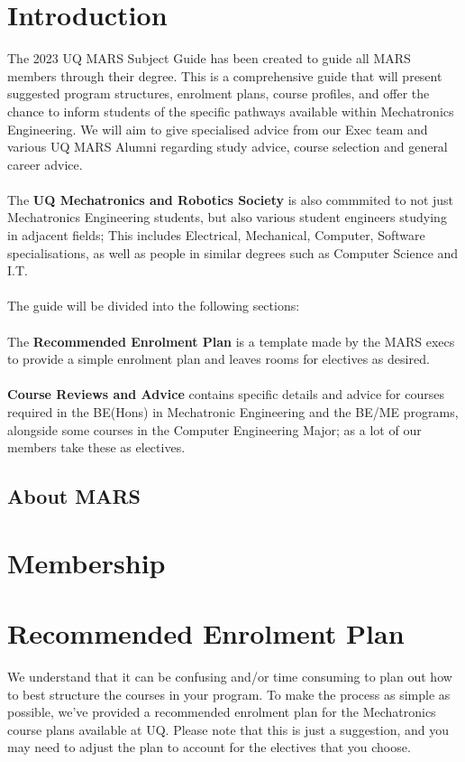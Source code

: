 \documentclass[a4paper,12pt]{report}
\begin{document}
\chapter{Introduction}
    The 2023 UQ MARS Subject Guide has been created to guide all MARS members through their degree. This is a comprehensive guide that will present suggested program structures, enrolment plans, course profiles, and offer the chance to inform students of the specific pathways available within Mechatronics Engineering. We will aim to give specialised advice from our Exec team and various UQ MARS Alumni regarding study advice, course selection and general career advice. \\
    \\ The \textbf{UQ Mechatronics and Robotics Society} is also commmited to not just Mechatronics Engineering students, but also various student engineers studying in adjacent fields; This includes Electrical, Mechanical, Computer, Software specialisations, as well as people in similar degrees such as Computer Science and I.T. \\
    \\ The guide will be divided into the following sections: \\
    \\ The \textbf{Recommended Enrolment Plan} is a template made by the MARS execs to provide a simple enrolment plan and leaves rooms for electives as desired. \\
    \\ \textbf{Course Reviews and Advice} contains specific details and advice for courses required in the BE(Hons) in Mechatronic Engineering and the BE/ME programs, alongside some courses in the Computer Engineering Major; as a lot of our members take these as electives. \\
    
    \section{About MARS}

\chapter{Membership}

\chapter{Recommended Enrolment Plan}
We understand that it can be confusing and/or time consuming to plan out how to best structure the courses in your program. To make the process as simple as possible, we've provided a recommended enrolment plan for the Mechatronics course plans available at UQ. Please note that this is just a suggestion, and you may need to adjust the plan to account for the electives that you choose.
\end{document}
